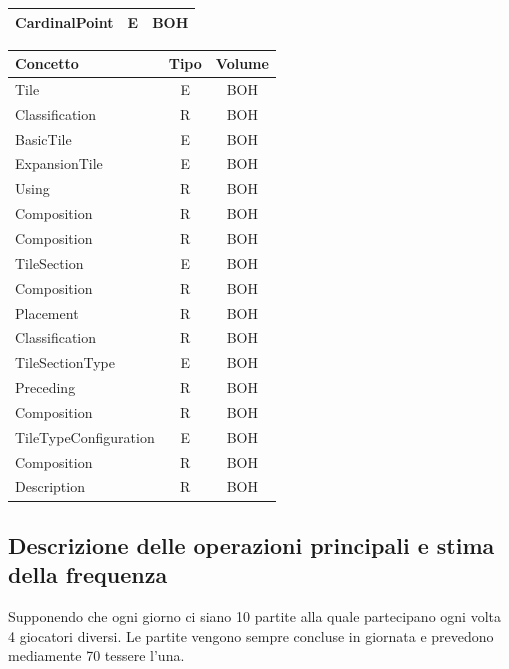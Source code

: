 {\begin{tabular}{ |l|c|c| }
CardinalPoint & E & BOH \\
\hline
\end{tabular}
\begin{tabular}{ |l|c|c| }
\hline
\textbf{Concetto} & \textbf{Tipo} & \textbf{Volume} \\
\hline
Tile & E & BOH \\
Classification & R & BOH \\
BasicTile & E & BOH \\
ExpansionTile & E & BOH \\
Using & R & BOH \\
Composition & R & BOH \\
\hline
Composition & R & BOH \\
TileSection & E & BOH \\
Composition & R & BOH \\
Placement & R & BOH \\
Classification & R & BOH \\
TileSectionType & E & BOH \\
Preceding & R & BOH \\
Composition & R & BOH \\
\hline
TileTypeConfiguration & E & BOH \\
Composition & R & BOH \\
Description & R & BOH \\
\hline
\end{tabular}}
\subsection{Descrizione delle operazioni principali e stima della frequenza}
Supponendo che ogni giorno ci siano 10 partite alla quale partecipano ogni volta 4 giocatori diversi. Le partite vengono sempre concluse in giornata e prevedono mediamente 70 tessere l'una.
\medskip


